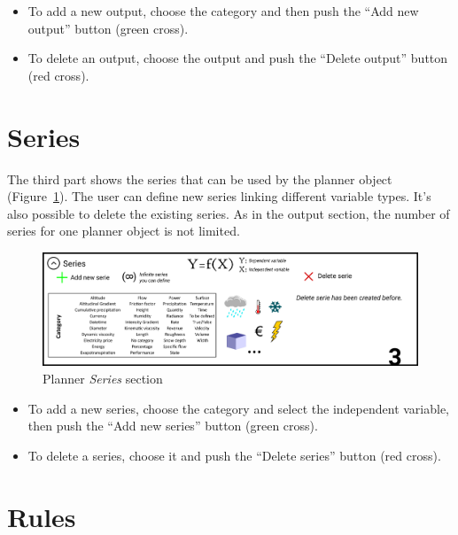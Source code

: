 \documentclass[
  letterpaper,
  DIV=11,
  numbers=noendperiod]{scrreprt}
\begin{document}
\begin{itemize}
\item
  {To add a new output, choose the category and then push the ``Add new
  output'' button (green cross).}
\item
  {To delete an output, choose the output and push the ``Delete output''
  button (red cross).}
\end{itemize}

\hypertarget{series}{%
\section{Series}\label{series}}

The third part shows the series that can be used by the planner object
(Figure~\ref{fig-planner_series_section}). The user can define new
series linking different variable types. It's also possible to delete
the existing series. As in the output section, the number of series for
one planner object is not limited.

\begin{figure}

{\centering \includegraphics{./figures/fig-planner_series_section.png}

}

\caption{\label{fig-planner_series_section}Planner \emph{Series}
section}

\end{figure}

\begin{itemize}
\item
  {To add a new series, choose the category and select the independent
  variable, then push the ``Add new series'' button (green cross).}
\item
  {To delete a series, choose it and push the ``Delete series'' button
  (red cross).}
\end{itemize}

\hypertarget{rules}{%
\section{Rules}\label{rules}}
\end{document}
